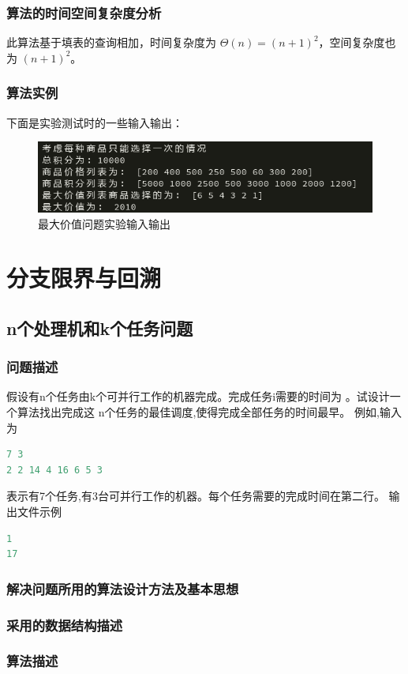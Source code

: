 \documentclass{ctexart}
\begin{document}
\subsubsection{算法的时间空间复杂度分析 }
此算法基于填表的查询相加，时间复杂度为 $\Theta(n) = (n+1)^2$，空间复杂度也为 $(n+1)^2$。
\subsubsection{算法实例}
下面是实验测试时的一些输入输出：
\begin{figure}[H]
	\centering
	\includegraphics[scale=0.6]{../images/xiaomei_max_value.png}
	\caption{最大价值问题实验输入输出}
\end{figure}


\newpage
\section{分支限界与回溯}
\subsection{n个处理机和k个任务问题}
\subsubsection{问题描述}
假设有n个任务由k个可并行工作的机器完成。完成任务i需要的时间为 。试设计一个算法找出完成这
n个任务的最佳调度,使得完成全部任务的时间最早。
例如,输入为
\begin{lstlisting}[language=C]
7 3
2 2 14 4 16 6 5 3
\end{lstlisting}
表示有7个任务,有3台可并行工作的机器。每个任务需要的完成时间在第二行。
输出文件示例
\begin{lstlisting}[language=C]
1
17
\end{lstlisting}
\subsubsection{解决问题所用的算法设计方法及基本思想}
\subsubsection{采用的数据结构描述}
\subsubsection{算法描述 }
\end{document}
